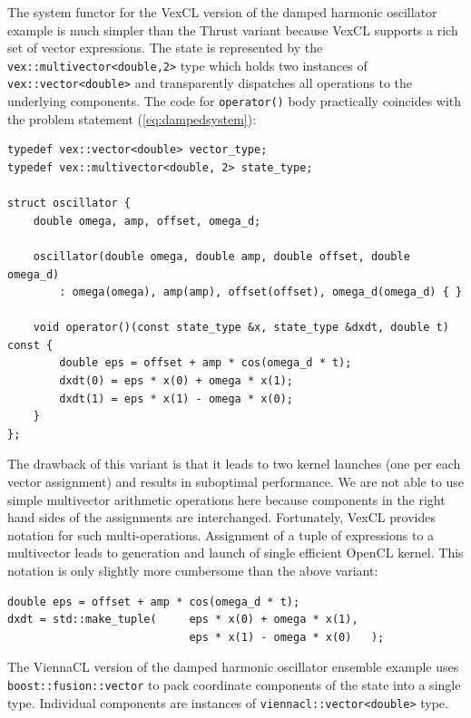 \documentclass[final]{siamltex}
\newcommand{\code}[1]{\lstinline|#1|}
\newcommand{\eqref}[1]{(\ref{#1})}
\begin{document}
The system functor for the VexCL version of the damped harmonic oscillator
example is much simpler than the Thrust variant because VexCL supports a rich
set of vector expressions. The state is represented by the
\code{vex::multivector<double,2>} type which holds two instances of
\code{vex::vector<double>} and transparently dispatches all operations to the
underlying components. The code for \code{operator()} body practically
coincides with the problem statement \eqref{eq:dampedsystem}:
\begin{lstlisting}
typedef vex::vector<double> vector_type;
typedef vex::multivector<double, 2> state_type;

struct oscillator {
    double omega, amp, offset, omega_d;

    oscillator(double omega, double amp, double offset, double omega_d)
        : omega(omega), amp(amp), offset(offset), omega_d(omega_d) { }

    void operator()(const state_type &x, state_type &dxdt, double t) const {
        double eps = offset + amp * cos(omega_d * t);
        dxdt(0) = eps * x(0) + omega * x(1);
        dxdt(1) = eps * x(1) - omega * x(0);
    }
};
\end{lstlisting}


The drawback of this variant is that it leads
to two kernel launches (one per each vector assignment) and results in
suboptimal performance. We are not able to use simple multivector arithmetic
operations here because components in the right hand sides of the assignments
are interchanged.  Fortunately, VexCL provides notation for such
multi-operations.  Assignment of a tuple of expressions to a multivector leads
to generation and launch of single efficient OpenCL kernel. This notation is
only slightly more cumbersome than the above variant:
\begin{lstlisting}[firstnumber=11]
double eps = offset + amp * cos(omega_d * t);
dxdt = std::make_tuple(     eps * x(0) + omega * x(1),
                            eps * x(1) - omega * x(0)   );
\end{lstlisting}

The ViennaCL version of the damped harmonic oscillator ensemble example uses
\code{boost::fusion::vector} to pack coordinate components of the state into a
single type. Individual components are instances of
\code{viennacl::vector<double>} type.
\end{document}
